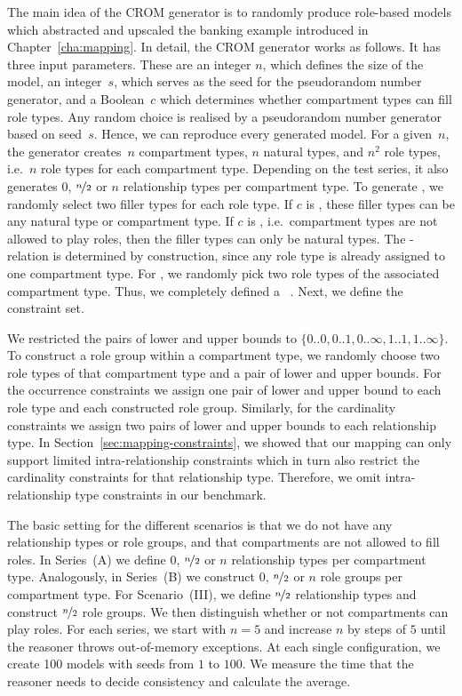 The main idea of the CROM generator is to randomly produce role-based models which abstracted and
upscaled the banking example introduced in Chapter~\ref{cha:mapping}.  In detail, the CROM generator
works as follows.  It has three input parameters.  These are an integer $n$, which defines the size
of the model, an integer~$s$, which serves as the seed for the pseudorandom number generator,  and a
Boolean~$c$ which determines whether compartment types can fill role types.  Any random choice is
realised by a pseudorandom number generator based on seed~$s$. Hence, we can reproduce every
generated model.  For a given~$n$, the generator creates~$n$ compartment types, $n$ natural types,
and $n^{2}$ role types, i.e.\ $n$ role types for each compartment type. Depending on the test series, it also
generates $0$, $\nicefrac{n}{2}$ or $n$ relationship types per compartment type.
%
To generate \fills, we randomly select two filler types for each role type. If $c$ is \true, these
filler types can be any natural type or compartment type. If $c$ is \false, i.e.\ compartment types
are not allowed to play roles, then the filler types can only be natural types.
The \parts-relation is determined by construction, since any role type is already assigned to one
compartment type.
For \rel, we randomly pick two role types of the associated compartment type. Thus, we completely
defined a \SCROM~\Mmc.  Next, we define the constraint set.



We restricted the pairs of lower and upper bounds to $\{0..0, 0..1, 0..\infty, 1..1,
1..\infty\}$. To construct a role group within a compartment type, we randomly choose two role types
of that compartment type and a pair of lower and upper bounds. For the occurrence constraints we
assign one pair of lower and upper bound to each role type and each constructed role
group. Similarly, for the cardinality constraints we assign two pairs of lower and upper bounds to
each relationship type. In Section~\ref{sec:mapping-constraints}, we showed that our mapping can
only support limited intra-relationship constraints which in turn also restrict the cardinality
constraints for that relationship type. Therefore, we omit intra-relationship type constraints in
our benchmark.


The basic setting for the different scenarios is that we do not have any relationship types or role
groups, and that compartments are not allowed to fill roles. In Series~(A) we define $0$,
$\nicefrac{n}{2}$ or $n$ relationship types per compartment type.  
%
Analogously, in Series~(B) we construct $0$, $\nicefrac{n}{2}$ or $n$ role groups per compartment
type.
%
For Scenario~(III), we define $\nicefrac{n}{2}$ relationship types and construct $\nicefrac{n}{2}$
role groups. We then distinguish whether or not compartments can play roles.
% 
For each series, we start with $n=5$ and increase $n$ by steps of $5$ until the reasoner throws
out-of-memory exceptions. At each single configuration, we create 100 models with seeds from $1$ to
$100$. We measure the time that the reasoner needs to decide consistency and calculate the average.


